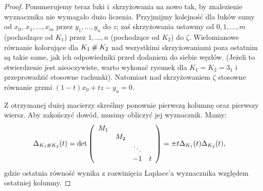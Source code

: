 \begin{proof}

    Ponumerujemy teraz łuki i~skrzyżowania na nowo tak, by znalezienie wyznacznika nie wymagało dużo liczenia.
    Przyjmijmy kolejność dla łuków sumy od $x_0$, $x_1, \ldots, x_m$ przez $y_1, \ldots, y_n$ do $z$; zaś skrzyżowania ustawmy od $0, 1, \ldots, m$ (pochodzące od $K_1$) przez $1, \ldots, n$ (pochodzące od $K_2$) do $\zeta$.
    Wielomianowe równanie kolorujące dla $K_1 \mathbin{\#} K_2$ nad wszystkimi skrzyżowaniami poza ostatnim są takie same, jak ich odpowiedniki przed dodaniem do siebie węzłów.
    (Jeżeli to stwierdzenie jest nieoczywiste, warto wykonać rysunek dla $K_1 = K_2 = 3_1$ i przeprowadzić stosowne rachunki).
    Natomiast nad skrzyżowaniem $\zeta$ stosowne równanie grzmi $(1-t)x_0 + tz - y_n = 0$.

    Z otrzymanej dużej macierzy skreślmy ponownie pierwszą kolumnę oraz pierwszy wiersz.
    Aby zakończyć dowód, musimy obliczyć jej wyznacznik.
    Mamy:
    \begin{align*}
        \Delta_{K_1 \mathbin{\#} K_2}(t) & = \det \left(\begin{array}{cccc}
            M_1 &     &        & \\
                & M_2 &        & \\
                &     & \ddots & \\
                &     & -1     & t
    \end{array}\right) = \pm t \Delta_{K_1}(t) \Delta_{K_2}(t),
    \end{align*}
    gdzie ostatnia równość wynika z rozwinięcia Laplace'a wyznacznika względem ostatniej kolumny.
\end{proof}

